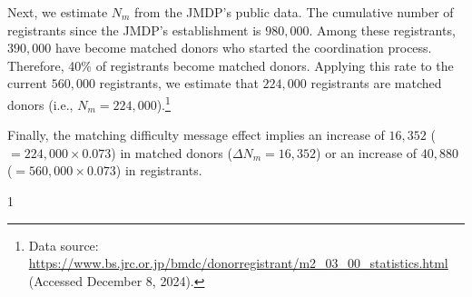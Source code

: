 \documentclass[12pt, a4paper]{article}
\begin{document}
Next, we estimate \(N_m\) from the JMDP's public data. The cumulative number of registrants since the JMDP's establishment is \(980,000\). Among these registrants, \(390,000\) have become matched donors who started the coordination process. Therefore, 40\% of registrants become matched donors. Applying this rate to the current \(560,000\) registrants, we estimate that \(224,000\) registrants are matched donors (i.e., \(N_m = 224,000\)).\footnote{Data source: \url{https://www.bs.jrc.or.jp/bmdc/donorregistrant/m2_03_00_statistics.html} (Accessed December 8, 2024).}

Finally, the matching difficulty message effect implies an increase of \(16,352\) (\(= 224,000 \times 0.073\)) in matched donors (\(\Delta N_m = 16,352\)) or an increase of \(40,880\) (\(= 560,000 \times 0.073\)) in registrants.

\begin{spacing}{1}
  
\end{spacing}
\end{document}

